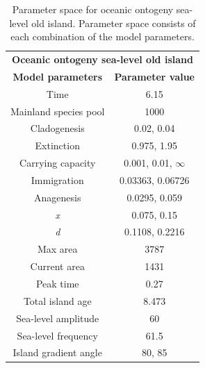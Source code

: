 \begin{table}[ht]
    \centering
    \caption{Parameter space for oceanic ontogeny sea-level old island. Parameter space consists of each combination of the model parameters.}
    \begin{tabular}{ c | c }
        \multicolumn{2}{c}{\textbf{Oceanic ontogeny sea-level old island}} \\
        \textbf{Model parameters} & \textbf{Parameter value} \\ 
        \hline
        \hline
        Time & 6.15 \\
        \hline
        Mainland species pool & 1000 \\
        \hline
        Cladogenesis & 0.02, 0.04 \\
        \hline
        Extinction & 0.975, 1.95 \\
        \hline
        Carrying capacity & 0.001, 0.01, $\infty$ \\
        \hline
        Immigration & 0.03363, 0.06726 \\
        \hline
        Anagenesis & 0.0295, 0.059 \\
        \hline
        \textit{x} & 0.075, 0.15 \\
        \hline
        \textit{d} & 0.1108, 0.2216 \\
        \hline
        Max area & 3787 \\
        \hline
        Current area & 1431 \\
        \hline
        Peak time & 0.27 \\
        \hline
        Total island age & 8.473 \\
        \hline
        Sea-level amplitude & 60 \\
        \hline
        Sea-level frequency & 61.5 \\
        \hline
        Island gradient angle & 80, 85 \\
    \end{tabular}
    \label{tab:oceanic_ontogeny_sea_level_old}
\end{table}

